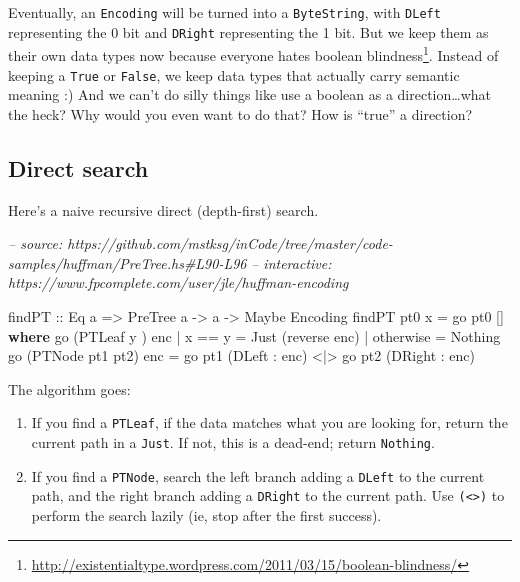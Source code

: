 \documentclass[]{article}
\newenvironment{Shaded}{}{}
\newcommand{\CommentTok}[1]{\textcolor[rgb]{0.38,0.63,0.69}{\textit{#1}}}
\newcommand{\DataTypeTok}[1]{\textcolor[rgb]{0.56,0.13,0.00}{#1}}
\newcommand{\FunctionTok}[1]{\textcolor[rgb]{0.02,0.16,0.49}{#1}}
\newcommand{\KeywordTok}[1]{\textcolor[rgb]{0.00,0.44,0.13}{\textbf{#1}}}
\newcommand{\NormalTok}[1]{#1}
\newcommand{\OtherTok}[1]{\textcolor[rgb]{0.00,0.44,0.13}{#1}}
\renewcommand{\href}[2]{#2\footnote{\url{#1}}}
\begin{document}
Eventually, an \texttt{Encoding} will be turned into a \texttt{ByteString}, with
\texttt{DLeft} representing the 0 bit and \texttt{DRight} representing the 1
bit. But we keep them as their own data types now because everyone hates
\href{http://existentialtype.wordpress.com/2011/03/15/boolean-blindness/}{boolean
blindness}. Instead of keeping a \texttt{True} or \texttt{False}, we keep data
types that actually carry semantic meaning :) And we can't do silly things like
use a boolean as a direction\ldots{}what the heck? Why would you even want to do
that? How is ``true'' a direction?

\hypertarget{direct-search}{%
\subsection{Direct search}\label{direct-search}}

Here's a naive recursive direct (depth-first) search.

\begin{Shaded}
\begin{Highlighting}[]
\CommentTok{-- source: https://github.com/mstksg/inCode/tree/master/code-samples/huffman/PreTree.hs#L90-L96}
\CommentTok{-- interactive: https://www.fpcomplete.com/user/jle/huffman-encoding}

\OtherTok{findPT ::} \DataTypeTok{Eq}\NormalTok{ a }\OtherTok{=>} \DataTypeTok{PreTree}\NormalTok{ a }\OtherTok{->}\NormalTok{ a }\OtherTok{->} \DataTypeTok{Maybe} \DataTypeTok{Encoding}
\NormalTok{findPT pt0 x }\FunctionTok{=}\NormalTok{ go pt0 []}
  \KeywordTok{where}
\NormalTok{    go (}\DataTypeTok{PTLeaf}\NormalTok{ y      ) enc }\FunctionTok{|}\NormalTok{ x }\FunctionTok{==}\NormalTok{ y    }\FunctionTok{=} \DataTypeTok{Just}\NormalTok{ (reverse enc)}
                            \FunctionTok{|}\NormalTok{ otherwise }\FunctionTok{=} \DataTypeTok{Nothing}
\NormalTok{    go (}\DataTypeTok{PTNode}\NormalTok{ pt1 pt2) enc }\FunctionTok{=}\NormalTok{ go pt1 (}\DataTypeTok{DLeft}  \FunctionTok{:}\NormalTok{ enc) }\FunctionTok{<|>}
\NormalTok{                              go pt2 (}\DataTypeTok{DRight} \FunctionTok{:}\NormalTok{ enc)}
\end{Highlighting}
\end{Shaded}

The algorithm goes:

\begin{enumerate}
\def\labelenumi{\arabic{enumi}.}
\item
  If you find a \texttt{PTLeaf}, if the data matches what you are looking for,
  return the current path in a \texttt{Just}. If not, this is a dead-end; return
  \texttt{Nothing}.
\item
  If you find a \texttt{PTNode}, search the left branch adding a \texttt{DLeft}
  to the current path, and the right branch adding a \texttt{DRight} to the
  current path. Use \texttt{(\textless{}\textbar{}\textgreater{})} to perform
  the search lazily (ie, stop after the first success).
\end{enumerate}
\end{document}
